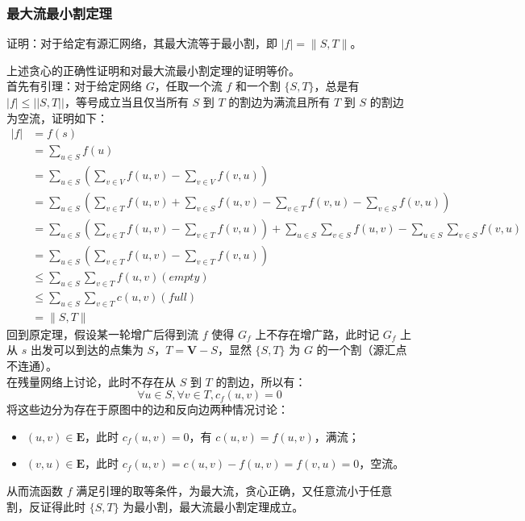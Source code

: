 \documentclass[12pt,a4paper]{article}
\begin{document}
\subsubsection{最大流最小割定理}
\begin{mdframed}[leftline=true, linewidth=2pt, linecolor=gray]
	证明：对于给定有源汇网络，其最大流等于最小割，即 $|f|=\|S,T\|$。
\end{mdframed}
上述贪心的正确性证明和对最大流最小割定理的证明等价。\\
首先有引理：对于给定网络 $G$，任取一个流 $f$ 和一个割 $\{S,T\}$，总是有 $|f|\le||S,T||$，等号成立当且仅当所有 $S$ 到 $T$ 的割边为满流且所有 $T$ 到 $S$ 的割边为空流，证明如下：
\begin{align*}
	|f| &= f(s) \\
	&= \sum_{u \in S} f(u) \\
	&= \sum_{u \in S} \left( \sum_{v \in V} f(u,v) - \sum_{v \in V} f(v,u) \right) \\
	&= \sum_{u \in S} \left( \sum_{v \in T} f(u,v) + \sum_{v \in S} f(u,v) - \sum_{v \in T} f(v,u) - \sum_{v \in S} f(v,u) \right) \\
	&= \sum_{u \in S} \left( \sum_{v \in T} f(u,v) - \sum_{v \in T} f(v,u) \right) 
	+ \sum_{u \in S}\sum_{v \in S} f(u,v) - \sum_{u \in S}\sum_{v \in S} f(v,u) \\
	&= \sum_{u \in S} \left( \sum_{v \in T} f(u,v) - \sum_{v \in T} f(v,u) \right) \\
	&\le \sum_{u \in S}\sum_{v \in T} f(u,v) (empty)\\
	&\le \sum_{u \in S}\sum_{v \in T} c(u,v) (full)\\
	&= \|S, T\|
\end{align*}
回到原定理，假设某一轮增广后得到流 $f$ 使得 $G_f$ 上不存在增广路，此时记 $G_f$ 上从 $s$ 出发可以到达的点集为 $S$，$T=\mathbf{V}-S$，显然 $\{S,T\}$ 为 $G$ 的一个割（源汇点不连通）。\\
在残量网络上讨论，此时不存在从 $S$ 到 $T$ 的割边，所以有：
\begin{equation*}
	\forall u\in S,\forall v\in T,c_f(u,v)=0
\end{equation*}
将这些边分为存在于原图中的边和反向边两种情况讨论：
\begin{itemize}
	\item $(u,v)\in\mathbf{E}$，此时 $c_f(u,v)=0$，有 $c(u,v)=f(u,v)$，满流；
	\item $(v,u)\in\mathbf{E}$，此时 $c_f(u,v)=c(u,v)-f(u,v)=f(v,u)=0$，空流。
\end{itemize}
从而流函数 $f$ 满足引理的取等条件，为最大流，贪心正确，又任意流小于任意割，反证得此时 $\{S,T\}$ 为最小割，最大流最小割定理成立。
\end{document}
